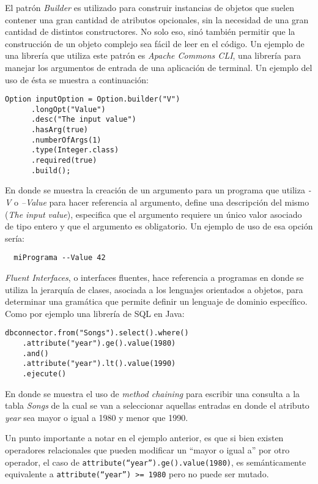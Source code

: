 El patr\'on \emph{Builder} es utilizado para construir instancias de objetos que suelen contener una gran cantidad de atributos opcionales, sin la necesidad de una gran cantidad de distintos constructores. No solo eso, sin\'o tambi\'en permitir que la construcci\'on de un objeto complejo sea f\'acil de leer en el c\'odigo. Un ejemplo de una librer\'ia que utiliza este patr\'on es \emph{Apache Commons CLI}, una librer\'ia para manejar los argumentos de entrada de una aplicaci\'on de terminal. Un ejemplo del uso de \'esta se muestra a continuaci\'on:
\begin{center}
	\begin{lstlisting}[mathescape=true]
    Option inputOption = Option.builder("V")
      .longOpt("Value")
      .desc("The input value")
      .hasArg(true)
      .numberOfArgs(1)
      .type(Integer.class)
      .required(true)
      .build();
	\end{lstlisting}
\end{center}
En donde se muestra la creaci\'on de un argumento para un programa que utiliza \emph{-V} o \emph{--Value} para hacer referencia al argumento, define una descripci\'on del mismo (\emph{The input value}), especifica que el argumento requiere un \'unico valor asociado de tipo entero y que el argumento es obligatorio. Un ejemplo de uso de esa opci\'on ser\'ia:
\begin{lstlisting}
  miPrograma --Value 42
\end{lstlisting}

\emph{Fluent Interfaces}, o interfaces fluentes, hace referencia a programas en donde se utiliza la jerarqu\'ia de clases, asociada a los lenguajes orientados a objetos, para determinar una gram\'atica que permite definir un lenguaje de dominio espec\'ifico. Como por ejemplo una librer\'ia de SQL en Java:
\begin{center}
	\begin{lstlisting}[mathescape=true]
	dbconnector.from("Songs").select().where()
	.attribute("year").ge().value(1980)
	.and()
	.attribute("year").lt().value(1990)
	.ejecute()
	\end{lstlisting}
\end{center}
En donde se muestra el uso de \emph{method chaining} para escribir una consulta a la tabla \emph{Songs} de la cual se van a seleccionar aquellas entradas en donde el atributo \emph{year} sea mayor o igual a 1980 y menor que 1990.

Un punto importante a notar en el ejemplo anterior, es que si bien existen operadores relacionales que pueden modificar un ``mayor o igual a'' por otro operador, el caso de \texttt{attribute(``year'').ge().value(1980)}, es sem\'anticamente equivalente a \texttt{attribute(``year'') >= 1980} pero no puede ser mutado.

